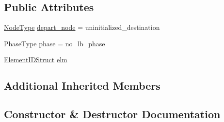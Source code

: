 \subsection*{Public Attributes}
\begin{DoxyCompactItemize}
\item 
\hyperlink{namespacevt_a866da9d0efc19c0a1ce79e9e492f47e2}{Node\+Type} \hyperlink{structvt_1_1vrt_1_1collection_1_1balance_1_1_l_b_data_restart_reader_1_1_depart_msg_a358d56cbb13dd103a6ad620318be1504}{depart\+\_\+node} = uninitialized\+\_\+destination
\item 
\hyperlink{namespacevt_a46ce6733d5cdbd735d561b7b4029f6d7}{Phase\+Type} \hyperlink{structvt_1_1vrt_1_1collection_1_1balance_1_1_l_b_data_restart_reader_1_1_depart_msg_a24a16bf35dbfd3e5e25e7d38736ac269}{phase} = no\+\_\+lb\+\_\+phase
\item 
\hyperlink{namespacevt_1_1vrt_1_1collection_1_1balance_a9f5b53fafb270212279a4757d2c4cd28}{Element\+I\+D\+Struct} \hyperlink{structvt_1_1vrt_1_1collection_1_1balance_1_1_l_b_data_restart_reader_1_1_depart_msg_a971917745c6eeb1762e1d345b270475b}{elm}
\end{DoxyCompactItemize}
\subsection*{Additional Inherited Members}


\subsection{Constructor \& Destructor Documentation}
\mbox{\label{structvt_1_1vrt_1_1collection_1_1balance_1_1_l_b_data_restart_reader_1_1_depart_msg_ae15909d6d9849206bcde8611ed200d29}} 

